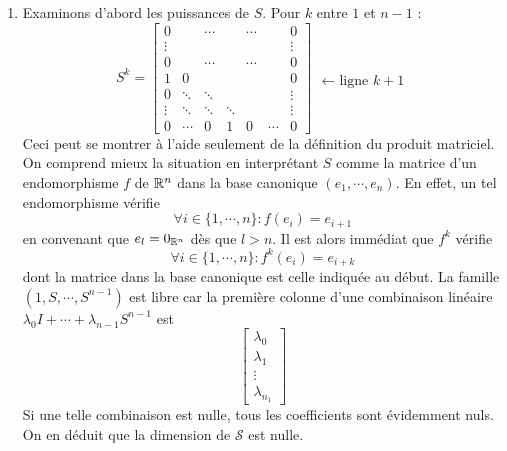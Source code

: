 \begin{enumerate}
\item Examinons d'abord les puissances de $S$. Pour $k$ entre $1$ et $n-1$ :
\begin{displaymath}
S^k = 
 \begin{bmatrix}
  0   &       & \cdots &       &\cdots &      &   0  \\
\vdots&       &        &       &       &      &\vdots\\
  0   &       & \cdots &       &\cdots &      &   0  \\
  1   &0      &        &       &       &      &   0  \\
  0   &\ddots & \ddots &       &       &      &\vdots\\
\vdots&\ddots & \ddots &\ddots &       &      &\vdots\\
0     &\cdots &0       &1      &0      &\cdots&   0
 \end{bmatrix}
\begin{matrix}
\phantom{0} \\ \phantom{\vdots}\\ \leftarrow\text{ligne } k+1 \\  \\ \\ \\ 
\end{matrix}
\end{displaymath}
Ceci peut se montrer à l'aide seulement de la définition du produit matriciel.\newline
On comprend mieux la situation en interprétant $S$ comme la matrice d'un endomorphisme $f$ de $\mathbb{R}^n$ dans la base canonique $(e_1,\cdots,e_n)$. En effet, un tel endomorphisme vérifie
\begin{displaymath}
 \forall i\in\{1,\cdots,n\} : f(e_i)=e_{i+1}
\end{displaymath}
en convenant que $e_l=0_{\mathbb{R}^n}$ dès que $l>n$. Il est alors immédiat que $f^k$ vérifie 
\begin{displaymath}
 \forall i\in\{1,\cdots,n\} : f^k(e_i)=e_{i+k}
\end{displaymath}
dont la matrice dans la base canonique est celle indiquée au début.\newline
La famille $(1,S,\cdots,S^{n-1})$ est libre car la première colonne d'une combinaison linéaire $\lambda_0I+\cdots+\lambda_{n-1}S^{n-1}$ est 
\begin{displaymath}
 \begin{bmatrix}
  \lambda_0\\\lambda_1\\ \vdots \\ \lambda_{n_1}
 \end{bmatrix}
\end{displaymath}
Si une telle combinaison est nulle, tous les coefficients sont évidemment nuls.\newline
On en déduit que la dimension de $\mathcal S$ est nulle.


\end{enumerate}
